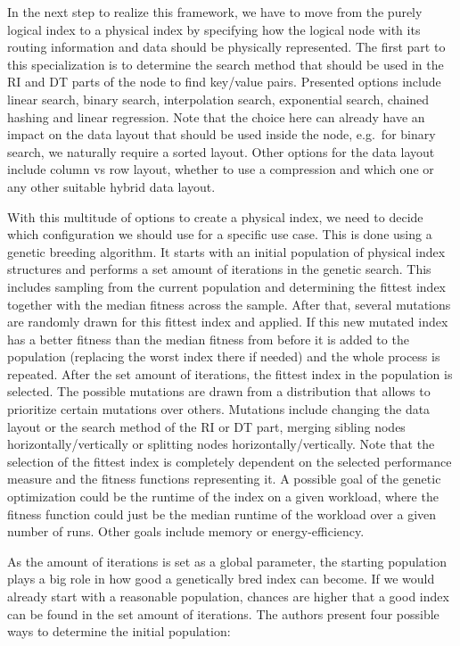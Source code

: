 In the next step to realize this framework, we have to move from the purely logical index to a physical index by specifying how the logical node with its routing information and data should be physically represented. The first part to this specialization is to determine the search method that should be used in the RI and DT parts of the node to find key/value pairs. Presented options include linear search, binary search, interpolation search, exponential search, chained hashing and linear regression. Note that the choice here can already have an impact on the data layout that should be used inside the node, e.g.~for binary search, we naturally require a sorted layout. Other options for the data layout include column vs row layout, whether to use a compression and which one or any other suitable hybrid data layout.

With this multitude of options to create a physical index, we need to decide which configuration we should use for a specific use case. This is done using a genetic breeding algorithm. It starts with an initial population of physical index structures and performs a set amount of iterations in the genetic search. This includes sampling from the current population and determining the fittest index together with the median fitness across the sample. After that, several mutations are randomly drawn for this fittest index and applied. If this new mutated index has a better fitness than the median fitness from before it is added to the population (replacing the worst index there if needed) and the whole process is repeated. After the set amount of iterations, the fittest index in the population is selected. The possible mutations are drawn from a distribution that allows to prioritize certain mutations over others. Mutations include changing the data layout or the search method of the RI or DT part, merging sibling nodes horizontally/vertically or splitting nodes horizontally/vertically. Note that the selection of the fittest index is completely dependent on the selected performance measure and the fitness functions representing it. A possible goal of the genetic optimization could be the runtime of the index on a given workload, where the fitness function could just be the median runtime of the workload over a given number of runs. Other goals include memory or energy-efficiency.

As the amount of iterations is set as a global parameter, the starting population plays a big role in how good a genetically bred index can become. If we would already start with a reasonable population, chances are higher that a good index can be found in the set amount of iterations. The authors present four possible ways to determine the initial population:

